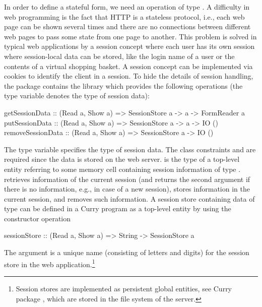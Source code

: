 In order to define a stateful form, we need an operation
of type .
A difficulty in web programming is the fact that HTTP
is a stateless protocol, i.e., each web page can be shown
several times and there are no connections between different web pages
to pass some state from one page to another.
This problem is solved in typical web applications
by a session concept where each user has its own session
where session-local data can be stored,
like the login name of a user or the contents of a virtual shopping basket.
A session concept can be implemented via cookies to identify
the client in a session.
To hide the details of session handling,
the package  contains the library 
which provides the following operations (the type variable 
denotes the type of session data):\label{sec:session}
%
\begin{curry}
getSessionData    :: (Read a, Show a) => SessionStore a -> a -> FormReader a
putSessionData    :: (Read a, Show a) => SessionStore a -> a -> IO ()
removeSessionData :: (Read a, Show a) => SessionStore a -> IO ()
\end{curry}
%
The type variable  specifies the type of session data.
The class constraints  and  are required
since the data is stored on the web server.
 is the type of a top-level entity
referring to some memory cell containing session information of type .
 retrieves information of the current session
(and returns the second argument if there is no information, e.g.,
in case of a new session),
 stores information in the current session,
and  removes such information.
A session store containing data of type 
can be defined in a Curry program as a top-level entity
by using the constructor operation
%
\begin{curry}
sessionStore :: (Read a, Show a) => String -> SessionStore a
\end{curry}
%
The argument is a unique name (consisting of letters and digits)
for the session store in the web application.\footnote{Session stores
are implemented as persistent global entities, see Curry package ,
which are stored in the file system of the server.}


